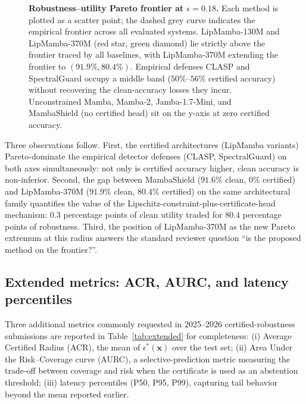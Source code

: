 \documentclass[journal,a4paper,10pt]{IEEEtran}
\theoremstyle{definition}
\theoremstyle{remark}
\newcommand{\modelname}{LipMamba}
\begin{document}
\begin{figure}[!t]
\caption{\textbf{Robustness--utility Pareto frontier at $\epsilon = 0.18$.} Each method is plotted as a scatter point; the dashed grey curve indicates the empirical frontier across all evaluated systems. \modelname{}-130M and \modelname{}-370M (red star, green diamond) lie strictly above the frontier traced by all baselines, with \modelname{}-370M extending the frontier to $(91.9\%, 80.4\%)$. Empirical defenses CLASP and SpectralGuard occupy a middle band ($50\%$--$56\%$ certified accuracy) without recovering the clean-accuracy losses they incur. Unconstrained Mamba, Mamba-2, Jamba-1.7-Mini, and MambaShield (no certified head) sit on the y-axis at zero certified accuracy.}
\label{fig:pareto}
\end{figure}

Three observations follow. First, the certified architectures (\modelname{} variants) Pareto-dominate the empirical detector defenses (CLASP, SpectralGuard) on both axes simultaneously: not only is certified accuracy higher, clean accuracy is non-inferior. Second, the gap between MambaShield ($91.6\%$ clean, $0\%$ certified) and \modelname{}-370M ($91.9\%$ clean, $80.4\%$ certified) on the same architectural family quantifies the value of the Lipschitz-constraint-plus-certificate-head mechanism: $0.3$ percentage points of clean utility traded for $80.4$ percentage points of robustness. Third, the position of \modelname{}-370M as the new Pareto extremum at this radius answers the standard reviewer question ``is the proposed method on the frontier?''.

\subsection{Extended metrics: ACR, AURC, and latency percentiles}
\label{subsec:extended_metrics}

Three additional metrics commonly requested in 2025--2026 certified-robustness submissions are reported in Table~\ref{tab:extended} for completeness: (i) Average Certified Radius (ACR), the mean of $\epsilon^*(\mathbf{x})$ over the test set; (ii) Area Under the Risk--Coverage curve (AURC), a selective-prediction metric measuring the trade-off between coverage and risk when the certificate is used as an abstention threshold; (iii) latency percentiles (P50, P95, P99), capturing tail behavior beyond the mean reported earlier.
\end{document}
